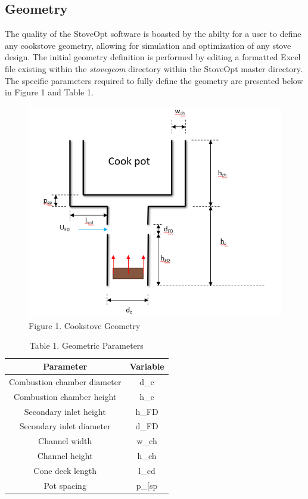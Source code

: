 \documentclass[3p,times,twocolumn]{elsarticle}
\begin{document}
\subsection{Geometry}
The quality of the StoveOpt software is boasted by the abilty for a user to define any cookstove geometry, allowing for simulation and optimization of any stove design. The initial geometry definition is performed by editing a formatted Excel file existing within the \textit{stovegeom} directory within the StoveOpt master directory. The specific parameters required to fully define the geometry are presented below in Figure 1 and Table 1.

\begin{figure}{\linewidth}
	\centering
	\includegraphics[width=\linewidth]{geometryfrompres.PNG}
	\caption{Figure 1. Cookstove Geometry}
\end{figure}

\newline

\begin{table}{\linewidth}
	\centering
	\begin{tabular}{||c c||} 
		  \hline
		   Parameter & Variable \\ [0.4ex] 
		    \hline\hline
		     Combustion chamber diameter & d_{c} \\ 
		     Combustion chamber height & h_{c} \\
		     Secondary inlet height & h_{FD} \\
		     Secondary inlet diameter & d_{FD} \\
		     Channel width & w_{ch} \\ [1ex] 
	             Channel height & h_{ch} \\ [1ex]
		     Cone deck length & l_{cd} \\ [1ex]
	             Pot spacing & p_[sp} \\ [1ex]
		     \hline
		     \end{tabular}
		     \newline
		     \newline
		     \caption{Table 1. Geometric Parameters}
	   
\end{table}
\end{document}

